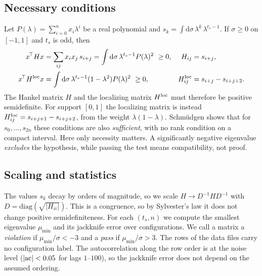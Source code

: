 \documentclass[11pt]{article}
\newcommand{\dd}{\mathrm{d}}
\theoremstyle{remark}
\begin{document}
\subsection{Necessary conditions}
Let $P(\lambda)=\sum_{i=0}^nx_i\lambda^i$ be a real polynomial and $s_k=\int\dd\sigma\,\lambda^k\,\lambda^{t_s-1}$. If $\sigma\ge0$ on $[-1,1]$ and $t_s$ is odd, then
\begin{align}
 x^{\!\top}H x&=\sum_{ij}x_ix_j\,s_{i+j}=\int\dd\sigma\,\lambda^{t_s-1}P(\lambda)^2\ \ge0,
 &H_{ij}&=s_{i+j},\label{eq:H0}\\
 x^{\!\top}H^{\rm loc}x&=\int\dd\sigma\,\lambda^{t_s-1}(1-\lambda^2)P(\lambda)^2\ \ge0,
 &H^{\rm loc}_{ij}&=s_{i+j}-s_{i+j+2}.\label{eq:Hloc}
\end{align}
The Hankel matrix $H$ and the localizing matrix $H^{\rm loc}$ must therefore be positive semidefinite. For support $[0,1]$ the localizing matrix is instead $H^{\rm loc}_{ij}=s_{i+j+1}-s_{i+j+2}$, from the weight $\lambda(1-\lambda)$.
Schm\"udgen \cite{Schmudgen:2020} shows that for $s_0,\dots,s_{2n}$ these conditions are also \emph{sufficient}, with no rank condition on a compact interval.
Here only necessity matters. A significantly negative eigenvalue \emph{excludes} the hypothesis, while passing the test means compatibility, not proof.

\subsection{Scaling and statistics}
The values $s_k$ decay by orders of magnitude, so we scale $H\to D^{-1}HD^{-1}$ with $D=\mathrm{diag}(\sqrt{|H_{ii}|})$. This is a congruence, so by Sylvester's law it does not change positive semidefiniteness.
For each $(t_s,n)$ we compute the smallest eigenvalue $\mu_{\min}$ and its jackknife error over configurations. We call a matrix a \emph{violation} if $\mu_{\min}/\sigma<-3$ and a \emph{pass} if $\mu_{\min}/\sigma>3$.
The rows of the data files carry no configuration label. The autocorrelation along the row order is at the noise level
($|{\rm ac}|<0.05$ for lags $1$--$100$), so the jackknife error does not depend on the assumed ordering.
\end{document}

